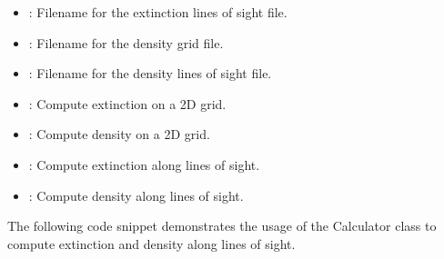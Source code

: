 \documentclass[letterpaper,10pt,english]{sphinxmanual}
\begin{document}
\begin{fulllineitems}
\begin{description}
\begin{itemize}
\item {} 
\sphinxAtStartPar
{}: Filename for the extinction lines of sight file.

\item {} 
\sphinxAtStartPar
{}: Filename for the density grid file.

\item {} 
\sphinxAtStartPar
{}: Filename for the density lines of sight file.

\end{itemize}

\begin{itemize}
\item {} 
\sphinxAtStartPar
{}: Compute extinction on a 2D grid.

\item {} 
\sphinxAtStartPar
{}: Compute density on a 2D grid.

\item {} 
\sphinxAtStartPar
{}: Compute extinction along lines of sight.

\item {} 
\sphinxAtStartPar
{}: Compute density along lines of sight.

\end{itemize}

\sphinxAtStartPar
The following code snippet demonstrates the usage of the Calculator class to compute extinction and density
along lines of sight.

\begin{sphinxVerbatim}[commandchars=\\\{\}]
       
\end{sphinxVerbatim}


\end{description}
\end{fulllineitems}
\end{document}
